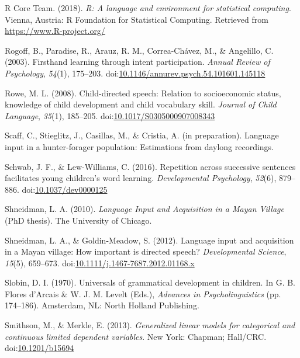 \documentclass[floatsintext,man]{apa6}
\theoremstyle{definition}
\theoremstyle{definition}
\theoremstyle{definition}
\theoremstyle{remark}
\begin{document}
\hypertarget{ref-R-base}{}
R Core Team. (2018). \emph{R: A language and environment for statistical
computing}. Vienna, Austria: R Foundation for Statistical Computing.
Retrieved from \url{https://www.R-project.org/}

\hypertarget{ref-rogoff2003firsthand}{}
Rogoff, B., Paradise, R., Arauz, R. M., Correa-Chávez, M., \& Angelillo,
C. (2003). Firsthand learning through intent participation. \emph{Annual
Review of Psychology}, \emph{54}(1), 175--203.
doi:\href{https://doi.org/10.1146/annurev.psych.54.101601.145118}{10.1146/annurev.psych.54.101601.145118}

\hypertarget{ref-rowe2008child}{}
Rowe, M. L. (2008). Child-directed speech: Relation to socioeconomic
status, knowledge of child development and child vocabulary skill.
\emph{Journal of Child Language}, \emph{35}(1), 185--205.
doi:\href{https://doi.org/10.1017/S0305000907008343}{10.1017/S0305000907008343}

\hypertarget{ref-scaffIPlanguage}{}
Scaff, C., Stieglitz, J., Casillas, M., \& Cristia, A. (in preparation).
Language input in a hunter-forager population: Estimations from daylong
recordings.

\hypertarget{ref-schwab2016repetition}{}
Schwab, J. F., \& Lew-Williams, C. (2016). Repetition across successive
sentences facilitates young children's word learning.
\emph{Developmental Psychology}, \emph{52}(6), 879--886.
doi:\href{https://doi.org/10.1037/dev0000125}{10.1037/dev0000125}

\hypertarget{ref-shneidman2010language}{}
Shneidman, L. A. (2010). \emph{Language Input and Acquisition in a Mayan
Village} (PhD thesis). The University of Chicago.

\hypertarget{ref-shneidman2012language}{}
Shneidman, L. A., \& Goldin-Meadow, S. (2012). Language input and
acquisition in a Mayan village: How important is directed speech?
\emph{Developmental Science}, \emph{15}(5), 659--673.
doi:\href{https://doi.org/10.1111/j.1467-7687.2012.01168.x}{10.1111/j.1467-7687.2012.01168.x}

\hypertarget{ref-slobin1970universals}{}
Slobin, D. I. (1970). Universals of grammatical development in children.
In G. B. Flores d'Arcais \& W. J. M. Levelt (Eds.), \emph{Advances in
Psycholinguistics} (pp. 174--186). Amsterdam, NL: North Holland
Publishing.

\hypertarget{ref-smithson2013generalized}{}
Smithson, M., \& Merkle, E. (2013). \emph{Generalized linear models for
categorical and continuous limited dependent variables}. New York:
Chapman; Hall/CRC.
doi:\href{https://doi.org/10.1201/b15694}{10.1201/b15694}
\end{document}
